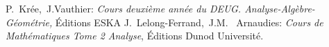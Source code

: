 \documentclass[11pt, a4paper]{book}
\begin{document}
\begin{thebibliography}{99} 
 P.~Kr\'ee,~J.Vauthier: \emph{Cours deuxi\`eme ann\'ee du DEUG. Analyse-Alg\`ebre-G\'eom\'etrie,}  
\'Editions ESKA 
 J.~Lelong-Ferrand,~J.M. ~Arnaudies: \emph{Cours de Math\'ematiques Tome 2 Analyse},  
\'Editions Dunod Universit\'e.
\end{thebibliography}
\end{document}

